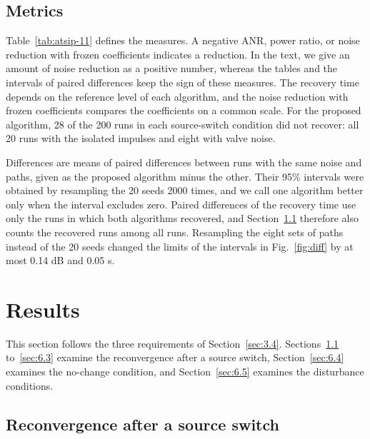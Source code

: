 \documentclass[sip,biber]{now-journal}
\begin{document}
\hypertarget{sec:5.4}{%
\subsection{Metrics}\label{sec:5.4}}



Table~\ref{tab:atsip-11} defines the measures. A negative ANR, power ratio, or noise reduction with frozen coefficients indicates a reduction. In the text, we give an amount of noise reduction as a positive number, whereas the tables and the intervals of paired differences keep the sign of these measures. The recovery time depends on the reference level of each algorithm, and the noise reduction with frozen coefficients compares the coefficients on a common scale. For the proposed algorithm, 28 of the 200 runs in each source-switch condition did not recover: all 20 runs with the isolated impulses and eight with valve noise.

Differences are means of paired differences between runs with the same noise and paths, given as the proposed algorithm minus the other. Their 95\% intervals were obtained by resampling the 20 seeds 2000 times, and we call one algorithm better only when the interval excludes zero. Paired differences of the recovery time use only the runs in which both algorithms recovered, and Section~\ref{sec:6.1} therefore also counts the recovered runs among all runs. Resampling the eight sets of paths instead of the 20 seeds changed the limits of the intervals in Fig.~\ref{fig:diff} by at most 0.14 dB and 0.05 s.

\hypertarget{sec:6}{%
\section{Results}\label{sec:6}}

This section follows the three requirements of Section~\ref{sec:3.4}. Sections~\ref{sec:6.1} to~\ref{sec:6.3} examine the reconvergence after a source switch, Section~\ref{sec:6.4} examines the no-change condition, and Section~\ref{sec:6.5} examines the disturbance conditions.

\hypertarget{sec:6.1}{%
\subsection{Reconvergence after a source switch}\label{sec:6.1}}
\end{document}
